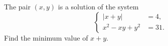 The pair $(x,y)$ is a solution of the system \[\left\{\begin{aligned} |x+y| &=4, \\ x^{2}-xy+y^{2} &=31. \end{aligned}\right.\]Find the minimum value of $x+y$.
